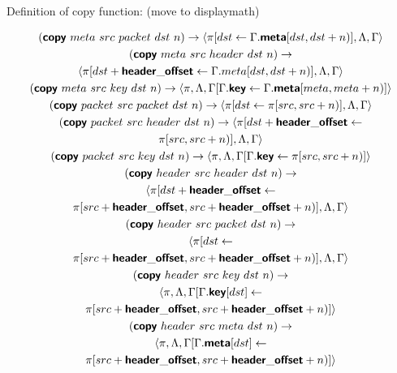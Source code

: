 Definition of copy function: (move to displaymath)
\begin{mdframed}
\begin{gather*}
  (\bm{\mathsf{{copy}}}  \ meta \ src \ packet \ dst \ n)
  \rightarrow
  \langle \pi[dst \leftarrow \Gamma.\bm{\mathsf{{meta}}}[dst, dst + n)],
  \Lambda, \Gamma \rangle
\\
  (\bm{\mathsf{{copy}}} \ meta \ src \ header \ dst \ n)
  \rightarrow \\
  \langle \pi[dst + \bm{\mathsf{{header\_offset}}} \leftarrow \Gamma.meta[dst, dst + n)],
  \Lambda, \Gamma \rangle
\\
  (\bm{\mathsf{{copy}}} \ meta \ src \ key \ dst \ n)
  \rightarrow
  \langle \pi, \Lambda, \Gamma[\Gamma.\bm{\mathsf{{key}}} \leftarrow
  \Gamma.\bm{\mathsf{{meta}}}[meta, meta + n)] \rangle
\\
  (\bm{\mathsf{{copy}}} \ packet \ src \ packet \ dst \ n)
  \rightarrow
  \langle \pi[dst \leftarrow \pi[src, src + n)], \Lambda, \Gamma \rangle
\\ 
  (\bm{\mathsf{{copy}}} \ packet \ src \ header \ dst \ n)
  \rightarrow
  \langle \pi[dst + \bm{\mathsf{{header\_offset}}} \leftarrow \\
  \pi[src, src + n)],
  \Lambda, \Gamma \rangle
\\ 
  (\bm{\mathsf{{copy}}} \ packet \ src \ key \ dst \ n)
  \rightarrow
  \langle \pi, \Lambda, \Gamma[\Gamma.\bm{\mathsf{{key}}} \leftarrow \pi[src, src + n)]
  \rangle
\\
  (\bm{\mathsf{{copy}}} \ header \ src \ header \ dst \ n)
  \rightarrow \\
  \langle \pi[dst + \bm{\mathsf{{header\_offset}}} \leftarrow \\
  \pi[src + \bm{\mathsf{{header\_offset}}}, src + \bm{\mathsf{{header\_offset}}} + n)],
  \Lambda, \Gamma \rangle
\\
  (\bm{\mathsf{{copy}}} \ header \ src \ packet \ dst \ n)
  \rightarrow \\
  \langle \pi[dst \leftarrow \\
  \pi[src + \bm{\mathsf{{header\_offset}}}, src +
  \bm{\mathsf{{header\_offset}}} + n)], \Lambda, \Gamma \rangle
\\
  (\bm{\mathsf{{copy}}} \ header \ src \ key \ dst \ n)
  \rightarrow \\
  \langle \pi, \Lambda, \Gamma[\Gamma.\bm{\mathsf{{key}}}[dst] \leftarrow \\
  \pi[src + 
  \bm{\mathsf{{header\_offset}}}, src + \bm{\mathsf{{header\_offset}}} + n)] \rangle
\\
  (\bm{\mathsf{{copy}}} \ header \ src \ meta \ dst \ n)
  \rightarrow \\
  \langle \pi, \Lambda, \Gamma[\Gamma.\bm{\mathsf{{meta}}}[dst] \leftarrow \\
  \pi[src + 
  \bm{\mathsf{{header\_offset}}}, src + \bm{\mathsf{{header\_offset}}} + n)] \rangle
\end{gather*}
\end{mdframed}

